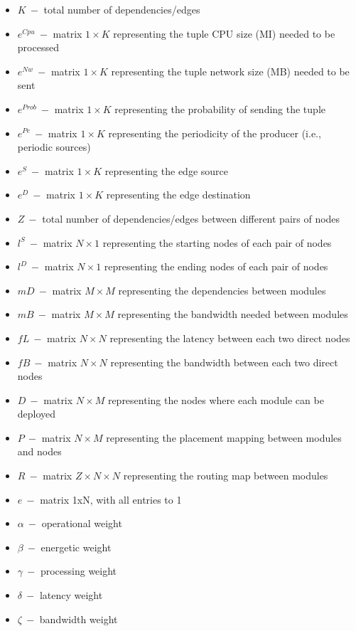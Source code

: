 \documentclass{article}
\begin{document}
\begin{itemize}
	\item $K~-$ total number of dependencies/edges
	\item $e^{Cpu}~-$ matrix $1\times K$ representing the tuple CPU size (MI) needed to be processed
	\item $e^{Nw}~-$ matrix $1\times K$ representing the tuple network size (MB) needed to be sent
	\item $e^{Prob}~-$ matrix $1\times K$ representing the probability of sending the tuple
	\item $e^{Pe}~-$ matrix $1\times K$ representing the periodicity of the producer (i.e., periodic sources)
	\item $e^{S}~-$ matrix $1\times K$ representing the edge source
	\item $e^{D}~-$ matrix $1\times K$ representing the edge destination\\
	
	\item $Z~-$ total number of dependencies/edges between different pairs of nodes
	\item $l^S~-$ matrix $N\times 1$ representing the starting nodes of each pair of nodes
	\item $l^D~-$ matrix $N\times 1$ representing the ending nodes of each pair of nodes\\
	
	\item $mD~-$ matrix $M\times M$ representing the dependencies between modules
	\item $mB~-$ matrix $M\times M$ representing the bandwidth needed between modules\\
	
	\item $fL~-$ matrix $N\times N$ representing the latency between each two direct nodes
	\item $fB~-$ matrix $N\times N$ representing the bandwidth between each two direct nodes\\
	
	\item $D~-$ matrix $N\times M$ representing the nodes where each module can be deployed\\
	
	\item $P~-$ matrix $N\times M$ representing the placement mapping between modules and nodes
	\item $R~-$ matrix $Z\times N\times N$ representing the routing map between modules\\
	
	\item $e~-$ matrix 1xN, with all entries to 1\\
	
	\item $\alpha~-$ operational weight
	\item $\beta~-$ energetic weight
	\item $\gamma~-$ processing weight
	\item $\delta~-$ latency weight
	\item $\zeta~-$ bandwidth weight
	
\end{itemize}
\end{document}
